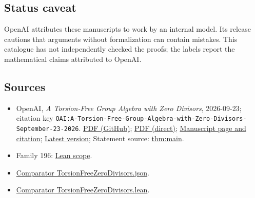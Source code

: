 \documentclass[11pt]{article}
\begin{document}
\subsection{Status caveat}
OpenAI attributes these manuscripts to work by an internal model. Its release cautions that arguments without formalization can contain mistakes. This catalogue has not independently checked the proofs; the labels report the mathematical claims attributed to OpenAI.

\subsection{Sources}
\begin{itemize}
\item OpenAI, \emph{A Torsion-Free Group Algebra with Zero Divisors}, 2026-09-23; citation key \texttt{OAI:A-Torsion-Free-Group-Algebra-with-Zero-Divisors-September-23-2026}. \href{https://github.com/openai/math/blob/adc7f1241b42e322a6451854ab7e4b4c146bf78a/preprints/A-Torsion-Free-Group-Algebra-with-Zero-Divisors-September-23-2026/paper.pdf}{PDF (GitHub)}; \href{https://github.com/openai/math/raw/adc7f1241b42e322a6451854ab7e4b4c146bf78a/preprints/A-Torsion-Free-Group-Algebra-with-Zero-Divisors-September-23-2026/paper.pdf}{PDF (direct)}; \href{https://github.com/openai/math/blob/adc7f1241b42e322a6451854ab7e4b4c146bf78a/preprints/A-Torsion-Free-Group-Algebra-with-Zero-Divisors-September-23-2026/README.md}{Manuscript page and citation}; \href{https://github.com/openai/math/blob/main/preprints/A-Torsion-Free-Group-Algebra-with-Zero-Divisors-September-23-2026/paper.pdf}{Latest version}; Statement source: \href{https://github.com/openai/math/blob/adc7f1241b42e322a6451854ab7e4b4c146bf78a/preprints/A-Torsion-Free-Group-Algebra-with-Zero-Divisors-September-23-2026/build/paper.tex\#L52}{thm:main}.
\item Family 196: \href{https://github.com/openai/math/blob/adc7f1241b42e322a6451854ab7e4b4c146bf78a/lean/docs/196.md}{Lean scope}.
\item \href{https://github.com/openai/math/blob/adc7f1241b42e322a6451854ab7e4b4c146bf78a/lean/ComparatorChallenges/TorsionFreeZeroDivisors.json}{Comparator TorsionFreeZeroDivisors.json}.
\item \href{https://github.com/openai/math/blob/adc7f1241b42e322a6451854ab7e4b4c146bf78a/lean/ComparatorChallenges/TorsionFreeZeroDivisors.lean}{Comparator TorsionFreeZeroDivisors.lean}.

\end{itemize}
\end{document}
